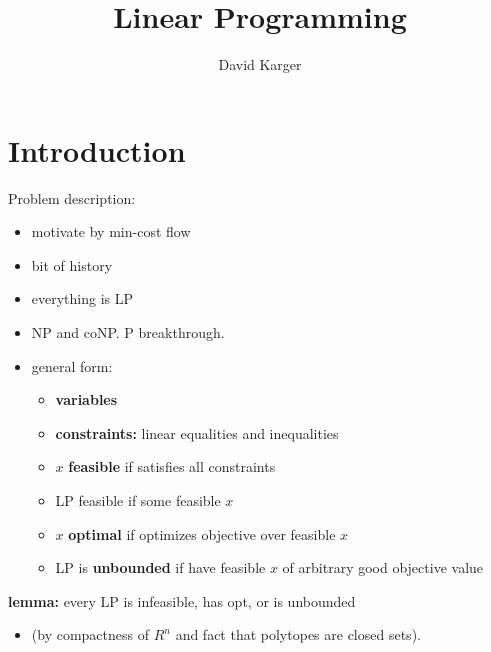 \documentclass{article}
\title{Linear Programming}
\author{David Karger}
\begin{document}

\section{Introduction}

Problem description:
\begin{itemize}
\item motivate by min-cost flow
\item bit of history
\item everything is LP
\item NP and coNP.   P breakthrough.
\item general form: 
  \begin{itemize}
  \item {\bf variables}
  \item {\bf constraints:} linear equalities and inequalities
  \item $x$ {\bf feasible} if satisfies all constraints
  \item LP feasible if some feasible $x$
  \item $x$ {\bf optimal} if optimizes objective over feasible $x$
  \item LP is {\bf unbounded} if have feasible $x$ of arbitrary good
    objective value
  \end{itemize}
\end{itemize}

{\bf lemma:} every LP is infeasible, has opt, or is unbounded
\begin{itemize}
  \item  (by compactness of $R^n$ and fact that polytopes are closed sets).
\end{itemize}
\end{document}
